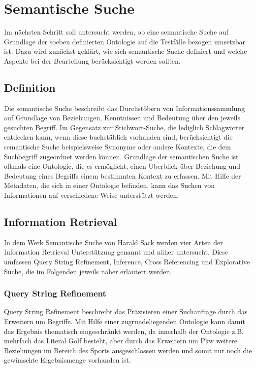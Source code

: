 \chapter{Semantische Suche}
Im nächsten Schritt soll untersucht werden, ob eine semantische Suche auf Grundlage der soeben definierten Ontologie auf die Testfälle bezogen umsetzbar ist. Dazu wird zunächst geklärt, wie sich semantische Suche definiert und welche Aspekte bei der Beurteilung berücksichtigt werden sollten.

\section{Definition}
Die semantische Suche beschreibt das Durchstöbern von Informationssammlung auf Grundlage von Beziehungen, Kenntnissen und Bedeutung über den jeweils gesuchten Begriff. Im Gegensatz zur Stichwort-Suche, die lediglich Schlagwörter entdecken kann, wenn diese buchstäblich vorhanden sind, berücksichtigt die semantische Suche beispielsweise Synonyme oder andere Kontexte, die dem Suchbegriff zugeordnet werden können.\newline
Grundlage der semantischen Suche ist oftmals eine Ontologie, die es ermöglicht, einen Überblick über Beziehung und Bedeutung eines Begriffs einem bestimmten Kontext zu erfassen. Mit Hilfe der Metadaten, die sich in einer Ontologie befinden, kann das Suchen von Informationen auf verschiedene Weise unterstützt werden.
\cite{Sack.2010}

\section{Information Retrieval}
In dem Werk \glqq Semantische Suche\grqq{} von Harald Sack\cite{Sack.2010} werden vier Arten der Information Retrieval Unterstützung genannt und näher untersucht. Diese umfassen \glqq Query String Refinement\grqq{}, \glqq Inference\grqq{}, \glqq Cross Referencing\grqq{} und \glqq Explorative Suche\grqq{}, die im Folgenden jeweils näher erläutert werden.

\subsection*{Query String Refinement}
Query String Refinement beschreibt das Präzisieren einer Suchanfrage durch das Erweitern um Begriffe. Mit Hilfe einer zugrundeliegenden Ontologie kann damit das Ergebnis thematisch eingeschränkt werden, da innerhalb der Ontologie z.B. mehrfach das Literal \glqq Golf\grqq{} besteht, aber durch das Erweitern um \glqq Pkw\grqq{} weitere Beziehungen im Bereich des Sports ausgeschlossen werden und somit nur noch die gewünschte Ergebnismenge vorhanden ist.

